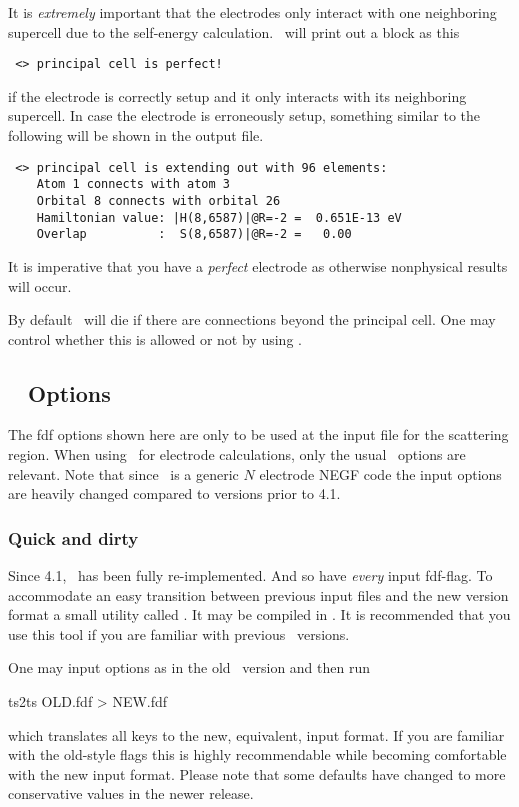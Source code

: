 It is \emph{extremely} important that the electrodes only interact
with one neighboring supercell due to the self-energy
calculation. \tsiesta\ will print out a block as this
\begin{verbatim}
 <> principal cell is perfect!
\end{verbatim}
if the electrode is correctly setup and it only interacts with its
neighboring supercell.
%
In case the electrode is erroneously setup, something similar to the
following will be shown in the output file.
\begin{verbatim}
 <> principal cell is extending out with 96 elements:
    Atom 1 connects with atom 3
    Orbital 8 connects with orbital 26
    Hamiltonian value: |H(8,6587)|@R=-2 =  0.651E-13 eV
    Overlap          :  S(8,6587)|@R=-2 =   0.00    
\end{verbatim}
It is imperative that you have a \emph{perfect} electrode as otherwise
nonphysical results will occur.

By default \tsiesta\ will die if there are connections beyond the
principal cell. One may control whether this is allowed or not by
using .

\subsection{\texorpdfstring{\tsiesta\ }{TranSIESTA} Options}

The fdf options shown here are only to be used at the input file for
the scattering region. When using \tsiesta\ for electrode
calculations, only the usual \siesta\ options are relevant.
%
Note that since \tsiesta\ is a generic $N$ electrode NEGF code the
input options are heavily changed compared to versions prior to 4.1.

\subsubsection{Quick and dirty}

Since 4.1, \tsiesta\ has been fully re-implemented. And so have
\emph{every} input fdf-flag. To accommodate an easy transition between
previous input files and the new version format a small utility called
. It may be compiled in . It is
recommended that you use this tool if you are familiar with previous
\tsiesta\ versions.

%
One may input options as in the old \tsiesta\ version and then run
\begin{fdfexample}
  ts2ts OLD.fdf > NEW.fdf
\end{fdfexample}
which translates all keys to the new, equivalent, input format. If you
are familiar with the old-style flags this is highly recommendable
while becoming comfortable with the new input format. Please note that
some defaults have changed to more conservative values in the newer
release.

